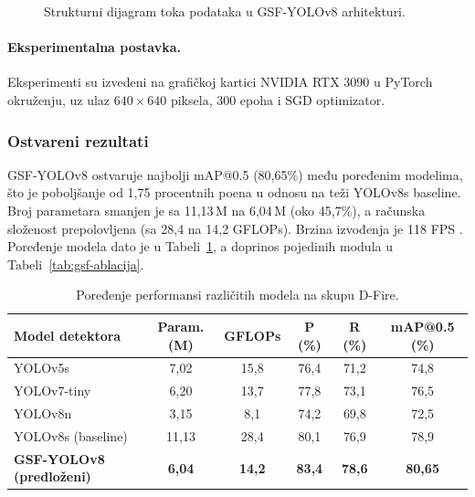 \begin{figure}[H]
\centering
{}
\caption{Strukturni dijagram toka podataka u GSF-YOLOv8 arhitekturi.}
\label{fig:gsf}
\end{figure}

\paragraph{Eksperimentalna postavka.} Eksperimenti su izvedeni na grafičkoj kartici NVIDIA RTX 3090 u PyTorch okruženju, uz ulaz $640\times 640$ piksela, 300 epoha i SGD optimizator.

\subsubsection{Ostvareni rezultati}
GSF-YOLOv8 ostvaruje najbolji mAP@0.5 (80,65\%) među poređenim modelima, što je poboljšanje od 1,75 procentnih poena u odnosu na teži YOLOv8s baseline. Broj parametara smanjen je sa 11,13\,M na 6,04\,M (oko 45,7\%), a računska složenost prepolovljena (sa 28,4 na 14,2 GFLOPs). Brzina izvođenja je 118 FPS \cite{ligsf}. Poređenje modela dato je u Tabeli~\ref{tab:gsf-poredjenje}, a doprinos pojedinih modula u Tabeli~\ref{tab:gsf-ablacija}.

\begin{table}[H]
\centering
\small
\setlength{\tabcolsep}{4pt}
\begin{tabular}{@{}lccccc@{}}
  \toprule
  \textbf{Model detektora} & \textbf{Param. (M)} & \textbf{GFLOPs} & \textbf{P (\%)} & \textbf{R (\%)} & \textbf{mAP@0.5 (\%)}\\
  \midrule
  YOLOv5s & 7,02 & 15,8 & 76,4 & 71,2 & 74,8\\
  YOLOv7-tiny & 6,20 & 13,7 & 77,8 & 73,1 & 76,5\\
  YOLOv8n & 3,15 & 8,1 & 74,2 & 69,8 & 72,5\\
  YOLOv8s (baseline) & 11,13 & 28,4 & 80,1 & 76,9 & 78,9\\
  \textbf{GSF-YOLOv8 (predloženi)} & \textbf{6,04} & \textbf{14,2} & \textbf{83,4} & \textbf{78,6} & \textbf{80,65}\\
  \bottomrule
\end{tabular}
\caption{Poređenje performansi različitih modela na skupu D-Fire.}
\label{tab:gsf-poredjenje}
\end{table}

